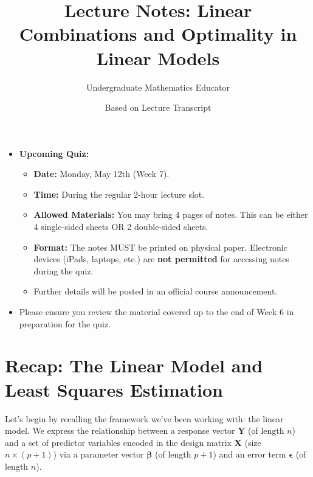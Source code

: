 \documentclass[11pt]{article}
\title{Lecture Notes: Linear Combinations and Optimality in Linear Models}
\author{Undergraduate Mathematics Educator}
\date{Based on Lecture Transcript} %
\theoremstyle{mytheoremstyle}
\theoremstyle{mydefinitionstyle}
\newcommand{\vect}[1]{\mathbf{#1}}
\begin{document}
\maketitle

\begin{announcementbox}
\begin{itemize}
    \item \textbf{Upcoming Quiz:}
        \begin{itemize}
            \item \textbf{Date:} Monday, May 12th (Week 7).
            \item \textbf{Time:} During the regular 2-hour lecture slot.
            \item \textbf{Allowed Materials:} You may bring 4 pages of notes. This can be either 4 single-sided sheets OR 2 double-sided sheets.
            \item \textbf{Format:} The notes MUST be printed on physical paper. Electronic devices (iPads, laptops, etc.) are \textbf{not permitted} for accessing notes during the quiz.
            \item Further details will be posted in an official course announcement.
        \end{itemize}
    \item Please ensure you review the material covered up to the end of Week 6 in preparation for the quiz.
\end{itemize}
\end{announcementbox}


\section{Recap: The Linear Model and Least Squares Estimation}

Let's begin by recalling the framework we've been working with: the linear model. We express the relationship between a response vector $\vect{Y}$ (of length $n$) and a set of predictor variables encoded in the design matrix $\vect{X}$ (size $n \times (p+1)$) via a parameter vector $\vect{\beta}$ (of length $p+1$) and an error term $\vect{\epsilon}$ (of length $n$).
\end{document}
